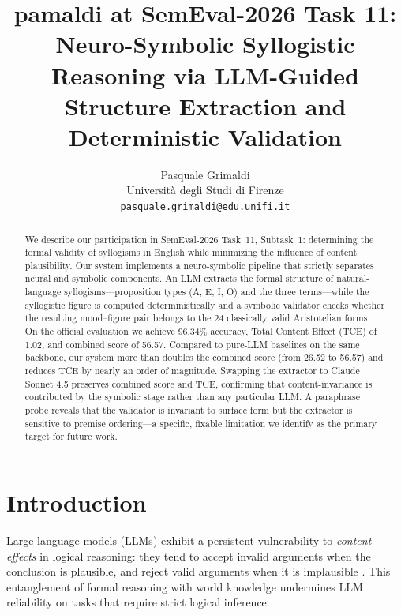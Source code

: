 \documentclass[11pt]{article}
\title{pamaldi at SemEval-2026 Task 11: Neuro-Symbolic Syllogistic Reasoning via LLM-Guided Structure Extraction and Deterministic Validation}
\author{Pasquale Grimaldi \\
  Università degli Studi di Firenze \\
  \texttt{pasquale.grimaldi@edu.unifi.it}}
\begin{document}
\maketitle

\begin{abstract}
We describe our participation in SemEval-2026 Task~11, Subtask~1: determining the formal validity of syllogisms in English while minimizing the influence of content plausibility. Our system implements a neuro-symbolic pipeline that strictly separates neural and symbolic components. An LLM extracts the formal structure of natural-language syllogisms---proposition types (A, E, I, O) and the three terms---while the syllogistic figure is computed deterministically and a symbolic validator checks whether the resulting mood--figure pair belongs to the 24 classically valid Aristotelian forms. On the official evaluation we achieve 96.34\% accuracy, Total Content Effect (TCE) of 1.02, and combined score of 56.57. Compared to pure-LLM baselines on the same backbone, our system more than doubles the combined score (from 26.52 to 56.57) and reduces TCE by nearly an order of magnitude. Swapping the extractor to Claude Sonnet 4.5 preserves combined score and TCE, confirming that content-invariance is contributed by the symbolic stage rather than any particular LLM. A paraphrase probe reveals that the validator is invariant to surface form but the extractor is sensitive to premise ordering---a specific, fixable limitation we identify as the primary target for future work.
\end{abstract}

\section{Introduction}

Large language models (LLMs) exhibit a persistent vulnerability to \emph{content effects} in logical reasoning: they tend to accept invalid arguments when the conclusion is plausible, and reject valid arguments when it is implausible \citep{dasgupta2022language, eisape2024systematic}. This entanglement of formal reasoning with world knowledge undermines LLM reliability on tasks that require strict logical inference.
\end{document}
